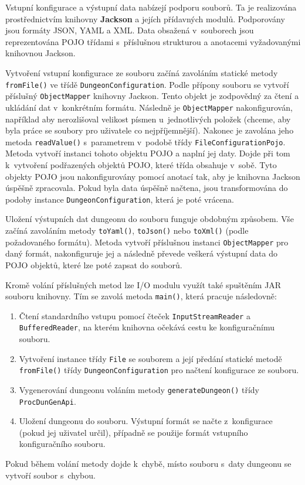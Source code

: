 Vstupní konfigurace a výstupní data nabízejí podporu souborů.
Ta je realizována prostřednictvím knihovny \textbf{Jackson} a jejích přídavných modulů.
Podporovány jsou formáty JSON, YAML a XML.
Data obsažená v~souborech jsou reprezentována POJO třídami s~příslušnou strukturou a anotacemi vyžadovanými knihovnou Jackson.
\par
Vytvoření vstupní konfigurace ze souboru začíná zavoláním statické metody \texttt{fromFile()} ve třídě \texttt{DungeonConfiguration}.
Podle přípony souboru se vytvoří příslušný \texttt{ObjectMapper} knihovny Jackson.
Tento objekt je zodpovědný za čtení a ukládání dat v~konkrétním formátu.
Následně je \texttt{ObjectMapper} nakonfigurován, například aby nerozlišoval velikost písmen u~jednotlivých položek (chceme, aby byla práce se soubory pro uživatele co nejpříjemnější).
Nakonec je zavolána jeho metoda \texttt{readValue()} s~parametrem v~podobě třídy \texttt{FileConfigurationPojo}.
Metoda vytvoří instanci tohoto objektu POJO a naplní jej daty.
Dojde při tom k~vytvoření podřazených objektů POJO, které třída obsahuje v~sobě.
Tyto objekty POJO jsou nakonfigurovány pomocí anotací tak, aby je knihovna Jackson úspěšně zpracovala.
Pokud byla data úspěšně načtena, jsou transformována do podoby instance \texttt{DungeonConfiguration}, která je poté vrácena.
\par
Uložení výstupních dat dungeonu do souboru funguje obdobným způsobem.
Vše začíná zavoláním metody \texttt{toYaml()}, \texttt{toJson()} nebo \texttt{toXml()} (podle požadovaného formátu).
Metoda vytvoří příslušnou instanci \texttt{ObjectMapper} pro daný formát, nakonfiguruje jej a následně převede veškerá výstupní data do POJO objektů, které lze poté zapsat do souborů.
\par
Kromě volání příslušných metod lze I/O modulu využít také spuštěním JAR souboru knihovny.
Tím se zavolá metoda \texttt{main()}, která pracuje následovně:
\begin{enumerate}
    \item Čtení standardního vstupu pomocí čteček  \texttt{InputStreamReader} a \texttt{BufferedReader}, na kterém knihovna očekává cestu ke konfiguračnímu souboru.
    \item Vytvoření instance třídy \texttt{File} se souborem a její předání statické metodě \texttt{fromFile()} třídy \texttt{DungeonConfiguration} pro načtení konfigurace ze souboru.
    \item Vygenerování dungeonu voláním metody \texttt{generateDungeon()} třídy \texttt{ProcDunGenApi}.
    \item Uložení dungeonu do souboru. Výstupní formát se načte z~konfigurace (pokud jej uživatel určil), případně se použije formát vstupního konfiguračního souboru.
\end{enumerate}
Pokud během volání metody dojde k~chybě, místo souboru s~daty dungeonu se vytvoří soubor s~chybou.

